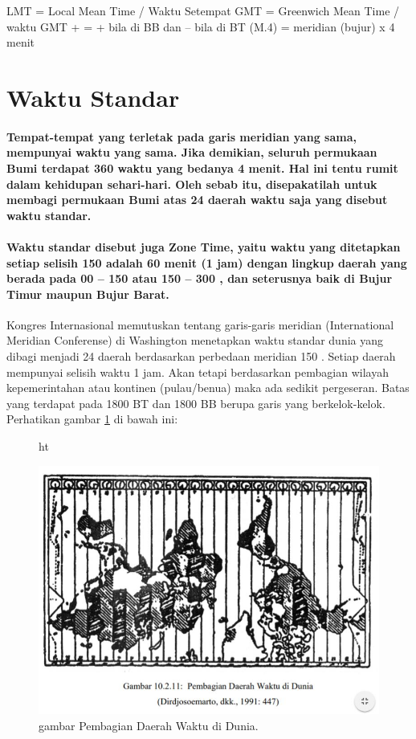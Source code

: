	LMT = Local Mean Time / Waktu Setempat 
GMT = Greenwich Mean Time / waktu GMT
 + = + bila di BB dan – bila di BT 
(M.4) = meridian (bujur) x 4 menit

\section{Waktu Standar}
\paragraph{Tempat-tempat yang terletak pada garis meridian yang sama, mempunyai waktu yang sama.
 Jika demikian, seluruh permukaan Bumi terdapat 360 waktu yang bedanya 4 menit.
 Hal ini tentu rumit dalam kehidupan sehari-hari. Oleh sebab itu, disepakatilah untuk
 membagi permukaan Bumi atas 24 daerah waktu saja yang disebut waktu standar.}
 
 \paragraph{Waktu standar disebut juga Zone Time, yaitu waktu yang ditetapkan setiap 
 selisih 150 adalah 60 menit (1 jam) dengan lingkup daerah yang berada pada 00 – 150
 atau 150 – 300 , dan seterusnya baik di Bujur Timur maupun Bujur Barat.}
 
 Kongres Internasional memutuskan tentang garis-garis meridian (International Meridian Conferense) 
 di Washington menetapkan waktu standar dunia yang dibagi menjadi 24 daerah berdasarkan
 perbedaan meridian 150 . Setiap daerah mempunyai selisih waktu 1 jam.
 Akan tetapi berdasarkan pembagian wilayah kepemerintahan atau kontinen (pulau/benua)
 maka ada sedikit pergeseran. Batas yang terdapat pada 1800 BT dan 1800 BB berupa garis
 yang berkelok-kelok. Perhatikan gambar \ref{sejarahwaktu_Capture1} di bawah ini:
 
 \begin{figure}{ht}
 \centerline{\includegraphics[width=1\textwidth]{figures/sejarahwaktu_Capture1.JPG}}
 \caption{gambar Pembagian Daerah Waktu di Dunia.}
 \label{sejarahwaktu_Capture1}
 \end{figure}
 
